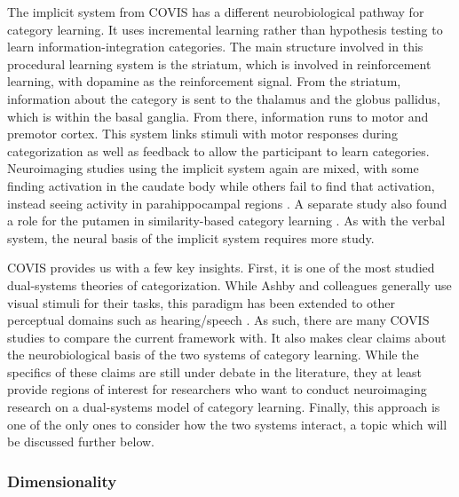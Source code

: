 \documentclass[../dissertation.tex]{subfiles}
\begin{document}
	The implicit system from COVIS has a different neurobiological pathway for category learning. It uses incremental learning rather than hypothesis testing to learn information-integration  categories. The main structure involved in this procedural learning system is the striatum, which is involved in reinforcement learning, with dopamine as the reinforcement signal. From the striatum, information about the category is sent to the thalamus and the globus pallidus, which is within the basal ganglia. From there, information runs to motor and premotor cortex. This system links stimuli with motor responses during categorization as well as feedback to allow the participant to learn categories. Neuroimaging studies using the implicit system again are mixed, with some finding activation in the caudate body while others fail to find that activation, instead seeing activity in parahippocampal regions \citep{Nomura2007,Carpenter2016}. A separate study also found a role for the putamen in similarity-based category learning \citep{Waldschmidt2011}. As with the verbal system, the neural basis of the implicit system requires more study. \par
	COVIS provides us with a few key insights. First, it is one of the most studied dual-systems theories of categorization. While Ashby and colleagues generally use visual stimuli for their tasks, this paradigm has been extended to other perceptual domains such as hearing/speech \citep{Chandrasekaran2014, Chandrasekaran2016}. As such, there are many COVIS studies to compare the current framework with. It also makes clear claims about the neurobiological basis of the two systems of category learning. While the specifics of these claims are still under debate in the literature, they at least provide regions of interest for researchers who want to conduct neuroimaging research on a dual-systems model of category learning. Finally, this approach is one of the only ones to consider how the two systems interact, a topic which will be discussed further below. \par
	
\subsubsection{Dimensionality}
\end{document}
